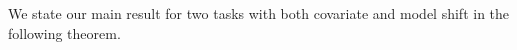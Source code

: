 




We state our main result for two tasks with both covariate and model shift in the following theorem.

